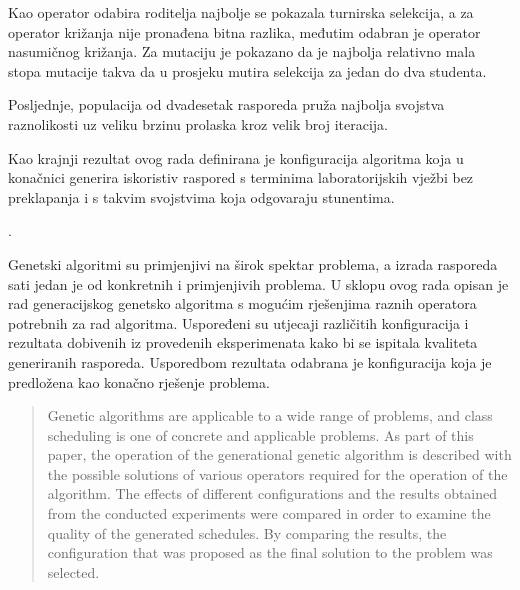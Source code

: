\documentclass[times, utf8, zavrsni]{fer}
\begin{document}
Kao operator odabira roditelja najbolje se pokazala turnirska selekcija, a za operator križanja nije pronađena bitna razlika, međutim odabran je operator nasumičnog križanja. Za mutaciju je pokazano da je najbolja relativno mala stopa mutacije takva da u prosjeku mutira selekcija za jedan do dva studenta.

Posljednje, populacija od dvadesetak rasporeda pruža najbolja svojstva raznolikosti uz veliku brzinu prolaska kroz velik broj iteracija.

Kao krajnji rezultat ovog rada definirana je konfiguracija algoritma koja u konačnici generira iskoristiv raspored s terminima laboratorijskih vježbi bez preklapanja i s takvim svojstvima koja odgovaraju stunentima.

.


\begin{sazetak}
Genetski algoritmi su primjenjivi na širok spektar problema, a izrada rasporeda sati jedan je od konkretnih i primjenjivih problema. U sklopu ovog rada opisan je rad generacijskog genetsko algoritma s mogućim rješenjima raznih operatora potrebnih za rad algoritma. Uspoređeni su utjecaji različitih konfiguracija i rezultata dobivenih iz provedenih eksperimenata kako bi se ispitala kvaliteta generiranih rasporeda. Usporedbom rezultata odabrana je konfiguracija koja je predložena kao konačno rješenje problema.

\end{sazetak}

\begin{abstract}
Genetic algorithms are applicable to a wide range of problems, and class scheduling is one of concrete and applicable problems. As part of this paper, the operation of the generational genetic algorithm is described with the possible solutions of various operators required for the operation of the algorithm. The effects of different configurations and the results obtained from the conducted experiments were compared in order to examine the quality of the generated schedules. By comparing the results, the configuration that was proposed as the final solution to the problem was selected.

\end{abstract}
\end{document}
